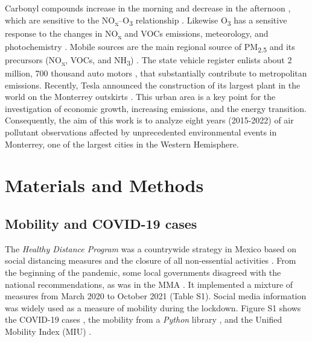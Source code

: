 \documentclass[preprint,12pt]{elsarticle}
\begin{document}
Carbonyl compounds increase in the morning and decrease in the afternoon \citep{j2012}, which are sensitive to the NO\textsubscript{x}--O\textsubscript{3} relationship \citep{Menchaca_Torre_2015a}. Likewise O\textsubscript{3} has a sensitive response to the changes in NO\textsubscript{x} and VOCs emissions, meteorology, and photochemistry \citep{Hern_ndez_Paniagua_2017}. Mobile sources are the main regional source of PM\textsubscript{2.5} and its precursors (NO\textsubscript{x}, VOCs, and NH\textsubscript{3}) \citep{Martinez-Cinco2016}. The state vehicle register enlists about 2 million, 700 thousand auto motors \citep{len}, that substantially contribute to metropolitan emissions. Recently, Tesla announced the construction of its largest plant in the world on the Monterrey outskirts \citep{tesla_2023}. This urban area is a key point for the investigation of economic growth, increasing emissions, and the energy transition. Consequently, the aim of this work is to analyze eight years (2015-2022) of air pollutant observations affected by unprecedented environmental events in Monterrey, one of the largest cities in the Western Hemisphere.
\section{Materials and Methods}
\subsection{Mobility and COVID-19 cases}
The \emph{Healthy Distance Program} was a countrywide strategy in Mexico based on social distancing measures and the closure of all non-essential activities \citep{covid-19a}. From the beginning of the pandemic, some local governments disagreed with the national recommendations, as was in the MMA \citep{state}. It implemented a mixture of measures from March 2020 to October 2021 (Table S1). Social media information was widely used as a measure of mobility during the lockdown. Figure S1 shows the COVID-19 cases \citep{covid19mex}, the mobility from a \emph{Python} library \citep{Graff_2022}, and the Unified Mobility Index (MIU) \citep{conacyt}.
\end{document}

